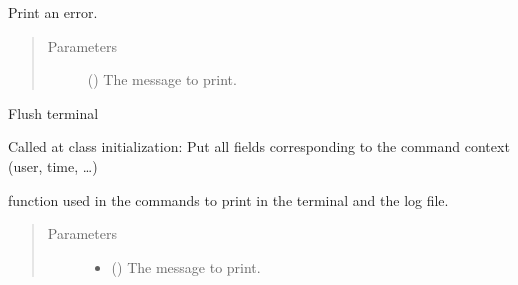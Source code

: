 \documentclass[a4paper,10pt,english]{sphinxmanual}
\begin{document}
\begin{fulllineitems}
\begin{fulllineitems}
\begin{quote}
\begin{description}
\end{description}\end{quote}

\end{fulllineitems}


\begin{fulllineitems}
\label{\detokenize{commands/apidoc/src:src.logger.Logger.error}}
Print an error.
\begin{quote}\begin{description}
\item[{Parameters}] \leavevmode
{} () \textendash{} The message to print.

\end{description}\end{quote}

\end{fulllineitems}


\begin{fulllineitems}
\label{\detokenize{commands/apidoc/src:src.logger.Logger.flush}}
Flush terminal

\end{fulllineitems}


\begin{fulllineitems}
\label{\detokenize{commands/apidoc/src:src.logger.Logger.put_initial_xml_fields}}
Called at class initialization: Put all fields 
corresponding to the command context (user, time, …)

\end{fulllineitems}


\begin{fulllineitems}
\label{\detokenize{commands/apidoc/src:src.logger.Logger.write}}
function used in the commands 
to print in the terminal and the log file.
\begin{quote}\begin{description}
\item[{Parameters}] \leavevmode\begin{itemize}
\item {} 
 () \textendash{} The message to print.


\end{itemize}
\end{description}
\end{quote}
\end{fulllineitems}
\end{fulllineitems}
\end{document}
